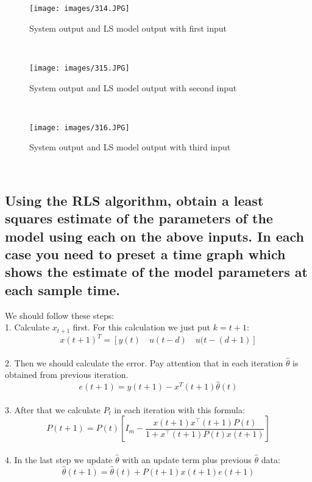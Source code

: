 \documentclass[11pt]{scrartcl} %
\begin{document}
\begin{figure}[H]
	\centering
	\texttt{[image: images/314.JPG]}
	\caption{System output and LS model output with first input}
\end{figure}\\

\begin{figure}[H]
	\centering
	\texttt{[image: images/315.JPG]}
	\caption{System output and LS model output with second input}
\end{figure}\\

\begin{figure}[H]
	\centering
	\texttt{[image: images/316.JPG]}
	\caption{System output and LS model output with third input}
\end{figure}\\
\subsection{Using the RLS algorithm, obtain a least squares estimate of the parameters of the model using each on the above inputs. In each case you need to preset a time graph which shows the estimate of the model parameters at each sample time.}
We should follow these steps:\\
1. Calculate $x_{t+1}$ first. For this calculation we just put $k=t+1$:
\begin{equation}
x(t+1)^{T}=[y(t) \quad u(t-d) \quad u(t-(d+1)]
\end{equation}\\
2. Then we should calculate the error. Pay attention that in each iteration $\hat{\theta}$ is obtained from previous iteration.
\begin{equation}e(t+1)=y(t+1)-x^{T}(t+1) \hat{\theta}(t)\end{equation}\\
3. After that we calculate $P_{t}$ in each iteration with this formula:
\begin{equation}P(t+1)=P(t)\left[I_{m}-\frac{x(t+1) x^{\top}(t+1) P(t)}{1+x^{\top}(t+1) P(t) x(t+1)}\right]\end{equation}\\
4. In the last step we update $\hat{\theta}$ with an update term plus previous $\hat{\theta}$ data:
\begin{equation}\hat{\theta}(t+1)=\hat{\theta}(t)+P(t+1) x(t+1) e(t+1)\end{equation}
\end{document}
